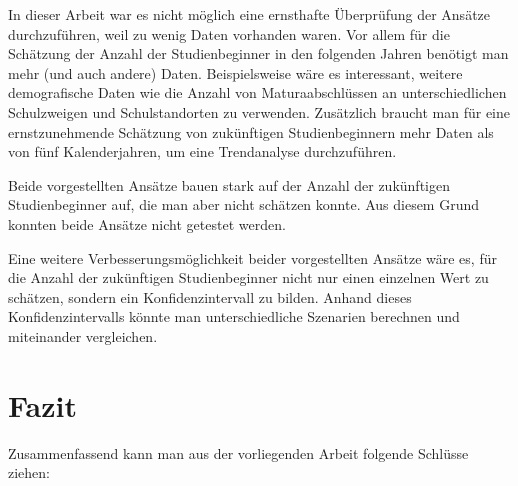 In dieser Arbeit war es nicht m\"oglich eine ernsthafte \"Uberpr\"ufung der Ans\"atze durchzuf\"uhren, weil zu wenig Daten vorhanden waren.
Vor allem f\"ur die Sch\"atzung der Anzahl der Studienbeginner in den folgenden Jahren ben\"otigt man mehr (und auch andere) Daten. Beispielsweise
w\"are es interessant, weitere demografische Daten wie die Anzahl von Maturaabschl\"ussen an unterschiedlichen Schulzweigen und Schulstandorten zu verwenden.
Zus\"atzlich braucht man f\"ur eine ernstzunehmende Sch\"atzung von zuk\"unftigen Studienbeginnern mehr Daten als von f\"unf Kalenderjahren, um eine Trendanalyse
durchzuf\"uhren.

Beide vorgestellten Ans\"atze bauen stark auf der Anzahl der zuk\"unftigen Studienbeginner auf, die man aber nicht sch\"atzen konnte. Aus diesem Grund konnten
beide Ans\"atze nicht getestet werden.

Eine weitere Verbesserungsm\"oglichkeit beider vorgestellten Ans\"atze w\"are es, f\"ur die Anzahl der zuk\"unftigen Studienbeginner nicht nur einen einzelnen Wert
zu sch\"atzen, sondern ein Konfidenzintervall zu bilden. Anhand dieses Konfidenzintervalls k\"onnte man unterschiedliche Szenarien berechnen und miteinander vergleichen.







\section{Fazit}

Zusammenfassend kann man aus der vorliegenden Arbeit folgende Schl\"usse ziehen:

